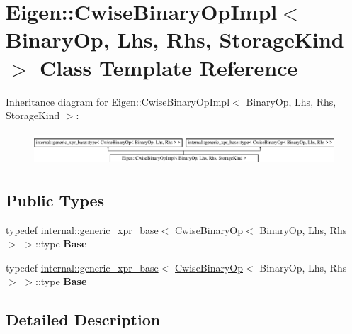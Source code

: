 \hypertarget{class_eigen_1_1_cwise_binary_op_impl}{}\section{Eigen\+:\+:Cwise\+Binary\+Op\+Impl$<$ Binary\+Op, Lhs, Rhs, Storage\+Kind $>$ Class Template Reference}
\label{class_eigen_1_1_cwise_binary_op_impl}
Inheritance diagram for Eigen\+:\+:Cwise\+Binary\+Op\+Impl$<$ Binary\+Op, Lhs, Rhs, Storage\+Kind $>$\+:\begin{figure}[H]
\begin{center}
\leavevmode
\includegraphics[height=1.247216cm]{class_eigen_1_1_cwise_binary_op_impl}
\end{center}
\end{figure}
\subsection*{Public Types}
\begin{DoxyCompactItemize}
\item 
\mbox{\label{class_eigen_1_1_cwise_binary_op_impl_a405ac3a82c17151da8476901c29b82fd}} 
typedef \hyperlink{struct_eigen_1_1internal_1_1generic__xpr__base}{internal\+::generic\+\_\+xpr\+\_\+base}$<$ \hyperlink{group___core___module_class_eigen_1_1_cwise_binary_op}{Cwise\+Binary\+Op}$<$ Binary\+Op, Lhs, Rhs $>$ $>$\+::type {\bfseries Base}
\item 
\mbox{\label{class_eigen_1_1_cwise_binary_op_impl_a405ac3a82c17151da8476901c29b82fd}} 
typedef \hyperlink{struct_eigen_1_1internal_1_1generic__xpr__base}{internal\+::generic\+\_\+xpr\+\_\+base}$<$ \hyperlink{group___core___module_class_eigen_1_1_cwise_binary_op}{Cwise\+Binary\+Op}$<$ Binary\+Op, Lhs, Rhs $>$ $>$\+::type {\bfseries Base}
\end{DoxyCompactItemize}


\subsection{Detailed Description}

